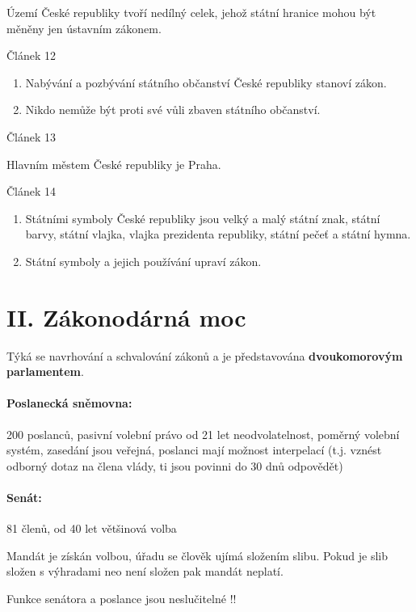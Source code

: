 \documentclass[10pt,a4paper,
twoside,%
]{report}
\begin{document}
Území České republiky tvoří nedílný celek, jehož státní hranice mohou být měněny jen ústavním zákonem.
 \begin{center}
Článek 12
\end{center}
\begin{enumerate} \item Nabývání a pozbývání státního občanství České republiky stanoví zákon.
\item Nikdo nemůže být proti své vůli zbaven státního občanství.
\end{enumerate} \begin{center}
Článek 13
\end{center}
Hlavním městem České republiky je Praha.
 \begin{center}
Článek 14
\end{center}

\begin{enumerate} \item Státními symboly České republiky jsou velký a malý státní znak, státní barvy, státní vlajka, vlajka prezidenta republiky, státní pečeť a státní hymna.
\item Státní symboly a jejich používání upraví zákon.
\end{enumerate}

\section[II. hlava]{II. Zákonodárná moc}
Týká se navrhování a schvalování zákonů a je představována \textbf{dvoukomorovým parlamentem}.
\paragraph{Poslanecká sněmovna:} 200 poslanců, pasivní volební právo od 21 let neodvolatelnost, poměrný volební systém, zasedání jsou veřejná, poslanci mají možnost interpelací (t.j. vznést odborný dotaz na člena vlády, ti jsou povinni do 30 dnů odpovědět)

\paragraph{Senát:} 81 členů, od 40 let většinová volba


Mandát je získán volbou, úřadu se člověk ujímá složením slibu. Pokud je slib složen s výhradami neo není složen pak mandát neplatí.

\begin{center}
\textsf{Funkce senátora a poslance jsou neslučitelné !!}
\end{center}
\end{document}
